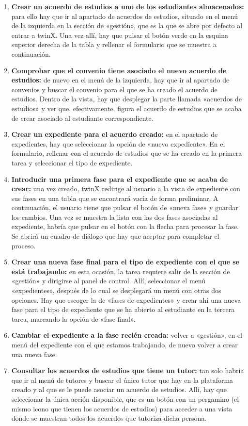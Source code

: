 \begin{enumerate}
	\item \textbf{Crear un acuerdo de estudios a uno de los estudiantes almacenados:} para ello hay que ir al apartado de acuerdos de estudios, situado en el menú de la izquierda en la sección de «gestión», que es la que se abre por defecto al entrar a twinX. Una vez allí, hay que pulsar el botón verde en la esquina superior derecha de la tabla y rellenar el formulario que se muestra a continuación.
	\item \textbf{Comprobar que el convenio tiene asociado el nuevo acuerdo de estudios:} de nuevo en el menú de la izquierda, hay que ir al apartado de convenios y buscar el convenio para el que se ha creado el acuerdo de estudios. Dentro de la vista, hay que desplegar la parte llamada «acuerdos de estudios» y ver que, efectivamente, figura el acuerdo de estudios que se acaba de crear asociado al estudiante correspondiente.
	\item \textbf{Crear un expediente para el acuerdo creado:} en el apartado de expedientes, hay que seleccionar la opción de «nuevo expediente». En el formulario, rellenar con el acuerdo de estudios que se ha creado en la primera tarea y seleccionar el tipo de expediente.
	\item \textbf{Introducir una primera fase para el expediente que se acaba de crear:} una vez creado, twinX redirige al usuario a la vista de expediente con sus fases en una tabla que se encontrará vacía de forma preliminar. A continuación, el usuario tiene que pulsar el botón de «nueva fase» y guardar los cambios. Una vez se muestra la lista con las dos fases asociadas al expediente, habría que pulsar en el botón con la flecha para procesar la fase. Se abrirá un cuadro de diálogo que hay que aceptar para completar el proceso.
	\item \textbf{Crear una nueva fase final para el tipo de expediente con el que se está trabajando:} en esta ocasión, la tarea requiere salir de la sección de «gestión» y dirigirse al panel de control. Allí, seleccionar el menú «expedientes», después de lo cual se desplegará un menú con otras dos opciones. Hay que escoger la de «fases de expedientes» y crear ahí una nueva fase para el tipo de expediente que se ha abierto al estudiante en la tercera tarea, marcando la opción de «fase final».
	\item \textbf{Cambiar el expediente a la fase recién creada:} volver a «gestión», en el menú del expediente con el que estamos trabajando, de nuevo volver a crear una nueva fase.
	\item \textbf{Consultar los acuerdos de estudios que tiene un tutor:} tan solo habría que ir al menú de tutores y buscar el único tutor que hay en la plataforma creado y al que se le puede asociar un acuerdo de estudios. Allí, hay que seleccionar la única acción disponible, que es un botón con un pergamino (el mismo icono que tienen los acuerdos de estudios) para acceder a una vista donde se muestran todos los acuerdos que tutoriza dicha persona. 
\end{enumerate}


